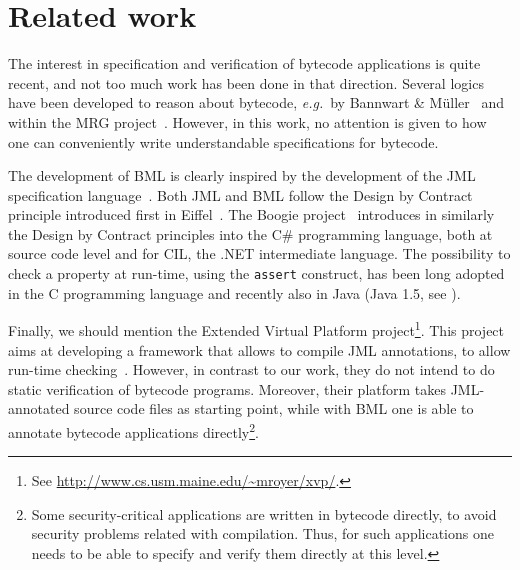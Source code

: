 

\section{Related work}\label{bml:relWork}
The interest in specification and verification of bytecode
applications is quite recent, and not too much work has been done in
that direction. Several logics have been developed to reason about
bytecode, \emph{e.g.}~by Bannwart \& M\"uller~\cite{BM05plb}
and within the MRG project~\cite{AspinallEtAl:TPHOLs2004}. However,
in this work, no attention is given to how one can conveniently write
understandable specifications for bytecode.

The development of BML is clearly inspired by the development of the
JML specification language~\cite{december-jml}. Both JML and
BML follow the Design by Contract principle introduced first in
Eiffel~\cite{M97oos}. The Boogie project~\cite{leinoWPUP}
introduces in similarly the Design by Contract principles into the C\#
programming language, both at source code level and for CIL, the .NET
intermediate language.  The possibility to check a property at
run-time, using the \texttt{assert} construct, has been long 
adopted in the C programming language and recently also in Java (Java
1.5, see \cite[\S 14.10]{JLS}). 

Finally, we should mention the Extended Virtual Platform
project\footnote{See
\url{http://www.cs.usm.maine.edu/~mroyer/xvp/}.}. This project aims at
developing a framework that allows to compile JML annotations, to
allow run-time checking~\cite{AlagicXVP05}. However, in contrast to
our work, they do not intend to do static verification of bytecode
programs. Moreover, their platform takes JML-annotated source code
files as starting point, while with BML one is able to annotate
bytecode applications directly\footnote{Some security-critical
applications are written in bytecode directly, to avoid security
problems related with compilation. Thus, for such applications one
needs to be able to specify and verify them directly at this level.}.

